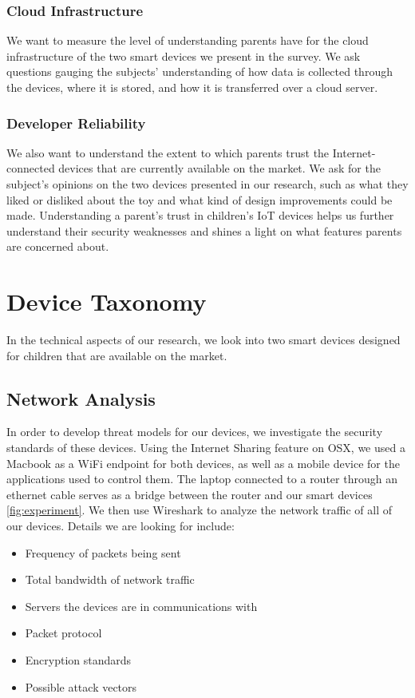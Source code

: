 \documentclass[12pt]{ucthesis}
\begin{document}
\subsubsection{Cloud Infrastructure}
We want to measure the level of understanding parents have for the cloud infrastructure of the two smart devices we present in the survey. We ask questions gauging the subjects' understanding of how data is collected through the devices, where it is stored, and how it is transferred over a cloud server. 

\subsubsection{Developer Reliability}
We also want to understand the extent to which parents trust the Internet-connected devices that are currently available on the market. We ask for the subject's opinions on the two devices presented in our research, such as what they liked or disliked about the toy and what kind of design improvements could be made. Understanding a parent's trust in children's IoT devices helps us further understand their security weaknesses and shines a light on what features parents are concerned about.

\section{Device Taxonomy}
In the technical aspects of our research, we look into two smart devices designed for children that are available on the market.

\subsection{Network Analysis}
In order to develop threat models for our devices, we investigate the security standards of these devices. Using the Internet Sharing feature on OSX, we used a Macbook as a WiFi endpoint for both devices, as well as a mobile device for the applications used to control them. The laptop connected to a router through an ethernet cable serves as a bridge between the router and our smart devices \ref{fig:experiment}. We then use Wireshark to analyze the network traffic of all of our devices. Details we are looking for include:

\begin{itemize}
    \item Frequency of packets being sent 
    \item Total bandwidth of network traffic 
    \item Servers the devices are in communications with 
    \item Packet protocol
    \item Encryption standards
    \item Possible attack vectors
\end{itemize}
\end{document}

